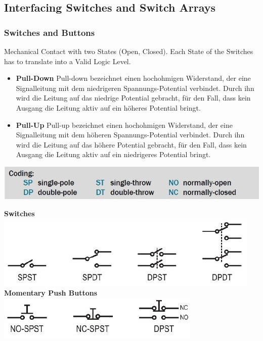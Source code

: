 \subsection{Interfacing Switches and Switch Arrays }
\subsubsection{Switches and Buttons}
	Mechanical Contact with two States (Open, Closed). Each State of the Switches has to translate into a Valid Logic Level. 
	\begin{itemize}
		\item \textbf{Pull-Down}
		\subitem Pull-down bezeichnet einen hochohmigen Widerstand, der eine Signalleitung mit dem niedrigeren Spannungs-Potential verbindet. Durch ihn wird die Leitung auf das niedrige Potential gebracht, für den Fall, dass kein Ausgang die Leitung aktiv auf ein höheres Potential bringt.
		\item \textbf{Pull-Up}
		\subitem Pull-up bezeichnet einen hochohmigen Widerstand, der eine Signalleitung mit dem höheren Spannungs-Potential verbindet. Durch ihn wird die Leitung auf das höhere Potential gebracht, für den Fall, dass kein Ausgang die Leitung aktiv auf ein niedrigeres Potential bringt.
	\end{itemize}
	\includegraphics[width=0.6\linewidth]{images/Coding_SW_BT.jpg}
\begin{multicols}{2}
	\textbf{Switches}\\
	\includegraphics[width=0.6\linewidth]{images/Switches.jpg}\\
	\textbf{Momentary Push Buttons}\\
	\includegraphics[width=0.6\linewidth]{images/Buttons.jpg}
\end{multicols}
